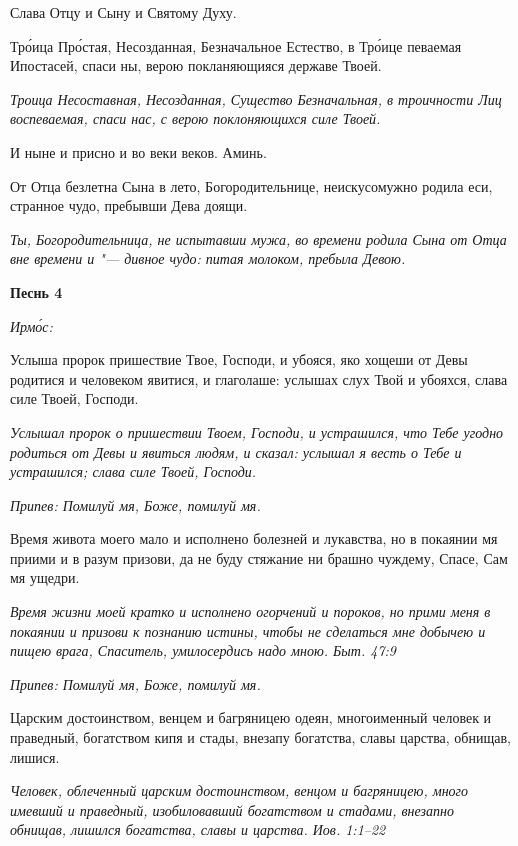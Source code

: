 Слава Отцу и Сыну и Святому Духу.


Тро́ица Про́стая, Несозданная, Безначальное Естество, в Тро́ице певаемая Ипостасей, спаси ны, верою покланяющияся державе Твоей.


\itshape Троица Несоставная, Несозданная, Существо Безначальная, в троичности Лиц воспеваемая, спаси нас, с верою поклоняющихся силе Твоей.\normalfont{}


И ныне и присно и во веки веков. Аминь.


От Отца безлетна Сына в лето, Богородительнице, неискусомужно родила еси, странное чудо, пребывши Дева доящи.


\itshape Ты, Богородительница, не испытавши мужа, во времени родила Сына от Отца вне времени и "--- дивное чудо: питая молоком, пребыла Девою.\normalfont{}





\bfseries Песнь 4\normalfont{}


\itshape Ирмо́с:\normalfont{}


Услыша пророк пришествие Твое, Господи, и убояся, яко хощеши от Девы родитися и человеком явитися, и глаголаше: услышах слух Твой и убояхся, слава силе Твоей, Господи.


\itshape Услышал пророк о пришествии Твоем, Господи, и устрашился, что Тебе угодно родиться от Девы и явиться людям, и сказал: услышал я весть о Тебе и устрашился; слава силе Твоей, Господи.\normalfont{}


\itshape Припев:\normalfont{} Помилуй мя, Боже, помилуй мя.


Время живота моего мало и исполнено болезней и лукавства, но в покаянии мя приими и в разум призови, да не буду стяжание ни брашно чуждему, Спасе, Сам мя ущедри.


\itshape Время жизни моей кратко и исполнено огорчений и пороков, но прими меня в покаянии и призови к познанию истины, чтобы не сделаться мне добычею и пищею врага, Спаситель, умилосердись надо мною. Быт. 47:9\normalfont{}


\itshape Припев:\normalfont{} Помилуй мя, Боже, помилуй мя.


Царским достоинством, венцем и багряницею одеян, многоименный человек и праведный, богатством кипя и стады, внезапу богатства, славы царства, обнищав, лишися.


\itshape Человек, облеченный царским достоинством, венцом и багряницею, много имевший и праведный, изобиловавший богатством и стадами, внезапно обнищав, лишился богатства, славы и царства. Иов. 1:1–22\normalfont{}


